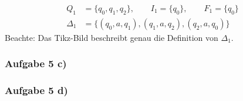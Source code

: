 \begin{align*}
	Q_1 &=\big\lbrace q_0,q_1,q_2\big\rbrace,\qquad I_1=\lbrace q_0\rbrace,\qquad F_1=\lbrace q_0\rbrace\\
	\Delta_1&=\big\lbrace(q_0,a,q_1),(q_1,a,q_2),(q_2,a,q_0)\big\rbrace
\end{align*}
Beachte: Das Tikz-Bild beschreibt genau die Definition von $\Delta_1$.

\subsubsection{Aufgabe 5 c)}

\subsubsection{Aufgabe 5 d)}
